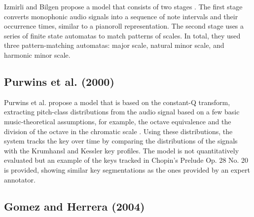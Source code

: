 Izmirli and Bilgen propose a model that consists of two stages \cite{izmirli_recognition_1994}. The first stage converts monophonic audio signals into a sequence of note intervals and their occurrence times, similar to a pianoroll representation. The second stage uses a series of finite state automatas to match patterns of scales. In total, they used three pattern-matching automatas: major scale, natural minor scale, and harmonic minor scale.

\subsection{Purwins et al. (2000)}

Purwins et al. propose a model that is based on the constant-Q transform, extracting pitch-class distributions from the audio signal based on a few basic music-theoretical assumptions, for example, the octave equivalence and the division of the octave in the chromatic scale \cite{purwins_new_2000}. Using these distributions, the system tracks the key over time by comparing the distributions of the signals with the Krumhansl and Kessler key profiles. The model is not quantitatively evaluated but an example of the keys tracked in Chopin's Prelude Op. 28 No. 20 is provided, showing similar key segmentations as the ones provided by an expert annotator.


\subsection{Gomez and Herrera (2004)}


